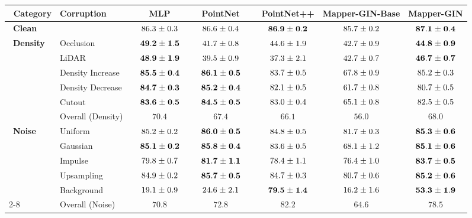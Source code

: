 \documentclass{article}
\begin{document}
\begin{table}[t]
\centering


\scriptsize
\setlength{\tabcolsep}{5.0pt}
\renewcommand{\arraystretch}{1.4}
\setlength{\belowrulesep}{1pt}
\setlength{\aboverulesep}{1pt}
\newcommand{\mspm}[2]{#1\mkern1mu\pm\mkern1mu#2}
\begin{tabular}{l l|c c c c c c}
\toprule
\, Category & Corruption
&& MLP
& PointNet
& PointNet++
& \!Mapper-GIN-Base\!
& \textbf{Mapper-GIN} \\
\midrule

\multicolumn{2}{l|}{\, \textbf{Clean}}
&& $\mspm{86.3}{0.3}$
& $\mspm{86.6}{0.4}$
& $\mathbf{\mspm{86.9}{0.2}}$
& $\mspm{85.7}{0.2}$
& \, $\mathbf{\mspm{87.1}{0.4}}$ \, \\
\midrule

\multirow{6}{*}{\, \textbf{Density}}
& Occlusion
&& $\mathbf{\mspm{49.2}{1.5}}$
& $\mspm{41.7}{0.8}$
& $\mspm{44.6}{1.9}$
& $\mspm{42.7}{0.9}$
& $\mathbf{\mspm{44.8}{0.9}}$ \\
& LiDAR
&& $\mathbf{\mspm{48.9}{1.9}}$
& $\mspm{39.5}{0.9}$
& $\mspm{37.3}{2.1}$
& $\mspm{42.7}{0.7}$
& $\mathbf{\mspm{46.7}{0.7}}$ \\
& Density Increase
&& $\mathbf{\mspm{85.5}{0.4}}$
& \, \, \, $\mathbf{\mspm{86.1}{0.5}}$ \, \, \,
& $\mspm{83.7}{0.5}$
& $\mspm{67.8}{0.9}$
& $\mspm{85.2}{0.3}$ \\
& Density Decrease
&& $\mathbf{\mspm{84.7}{0.3}}$
& $\mathbf{\mspm{85.2}{0.4}}$
& $\mspm{82.1}{0.5}$
& $\mspm{61.7}{0.8}$
& $\mspm{80.7}{0.5}$ \\
& Cutout
&& $\mathbf{\mspm{83.6}{0.5}}$
& $\mathbf{\mspm{84.5}{0.5}}$
& $\mspm{83.0}{0.4}$
& $\mspm{65.1}{0.8}$
& $\mspm{82.5}{0.5}$ \\
\cline{2-8}
& Overall (Density)
&& $\mathbf{70.4}$
& $67.4$
& $66.1$
& $56.0$
& $\mathbf{68.0}$ \\
\midrule

\multirow{5}{*}{\, \textbf{Noise}}
& Uniform
&& $\mspm{85.2}{0.2}$
& $\mathbf{\mspm{86.0}{0.5}}$
& $\mspm{84.8}{0.5}$
& $\mspm{81.7}{0.3}$
& $\mathbf{\mspm{85.3}{0.6}}$ \\
& Gaussian
&& $\mathbf{\mspm{85.1}{0.2}}$
& $\mathbf{\mspm{85.8}{0.4}}$
& $\mspm{83.6}{0.5}$
& $\mspm{68.1}{1.2}$
& $\mathbf{\mspm{85.1}{0.6}}$ \\
& Impulse
&& $\mspm{79.8}{0.7}$
& $\mathbf{\mspm{81.7}{1.1}}$
& $\mspm{78.4}{1.1}$
& $\mspm{76.4}{1.0}$
& $\mathbf{\mspm{83.7}{0.5}}$ \\
& Upsampling
&& $\mspm{84.9}{0.2}$
& $\mathbf{\mspm{85.7}{0.5}}$
& $\mspm{84.7}{0.3}$
& $\mspm{80.7}{0.6}$
& $\mathbf{\mspm{85.2}{0.6}}$ \\
& Background
&& $\mspm{19.1}{0.9}$
& $\mspm{24.6}{2.1}$
& \, $\mathbf{\mspm{79.5}{1.4}}$ \,
& $\mspm{16.2}{1.6}$
& $\mathbf{\mspm{53.3}{1.9}}$ \\
\cline{2-8}
& Overall (Noise)
&& $70.8$
& $72.8$
& $\mathbf{82.2}$
& $64.6$
& $\mathbf{78.5}$ \\
\midrule


\end{tabular}
\end{table}
\end{document}
